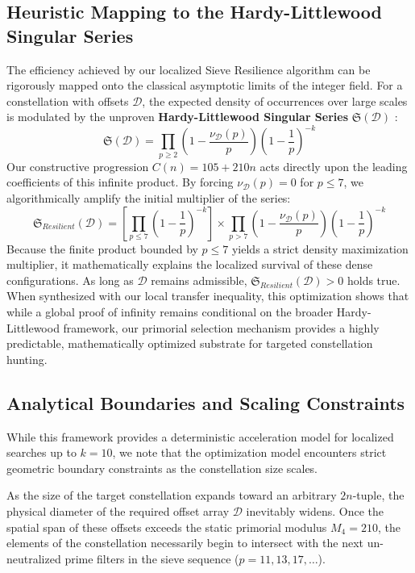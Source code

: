 \documentclass[sn-mathphys-num, pdflatex]{sn-jnl}
\begin{document}
\subsection{Heuristic Mapping to the Hardy-Littlewood Singular Series}
The efficiency achieved by our localized Sieve Resilience algorithm can be rigorously mapped onto the classical asymptotic limits of the integer field. For a constellation with offsets $\mathcal{D}$, the expected density of occurrences over large scales is modulated by the unproven \textbf{Hardy-Littlewood Singular Series} $\mathfrak{S}(\mathcal{D})$ \cite{Hardy1923}:
\begin{equation}
\mathfrak{S}(\mathcal{D}) = \prod_{p \ge 2} \left( 1 - \frac{\nu_{\mathcal{D}}(p)}{p} \right) \left( 1 - \frac{1}{p} \right)^{-k}
\end{equation}
Our constructive progression $C(n) = 105 + 210n$ acts directly upon the leading coefficients of this infinite product. By forcing $\nu_{\mathcal{D}}(p) = 0$ for $p \le 7$, we algorithmically amplify the initial multiplier of the series:
\begin{equation}
\mathfrak{S}_{Resilient}(\mathcal{D}) = \left[ \prod_{p \le 7} \left( 1 - \frac{1}{p} \right)^{-k} \right] \times \prod_{p > 7} \left( 1 - \frac{\nu_{\mathcal{D}}(p)}{p} \right) \left( 1 - \frac{1}{p} \right)^{-k}
\end{equation}
Because the finite product bounded by $p \le 7$ yields a strict density maximization multiplier, it mathematically explains the localized survival of these dense configurations. As long as $\mathcal{D}$ remains admissible, $\mathfrak{S}_{Resilient}(\mathcal{D}) > 0$ holds true. When synthesized with our local transfer inequality, this optimization shows that while a global proof of infinity remains conditional on the broader Hardy-Littlewood framework, our primorial selection mechanism provides a highly predictable, mathematically optimized substrate for targeted constellation hunting.

\subsection{Analytical Boundaries and Scaling Constraints}
While this framework provides a deterministic acceleration model for localized searches up to $k=10$, we note that the optimization model encounters strict geometric boundary constraints as the constellation size scales.

As the size of the target constellation expands toward an arbitrary $2n$-tuple, the physical diameter of the required offset array $\mathcal{D}$ inevitably widens. Once the spatial span of these offsets exceeds the static primorial modulus $M_4 = 210$, the elements of the constellation necessarily begin to intersect with the next un-neutralized prime filters in the sieve sequence ($p = 11, 13, 17, \dots$). 
\end{document}
